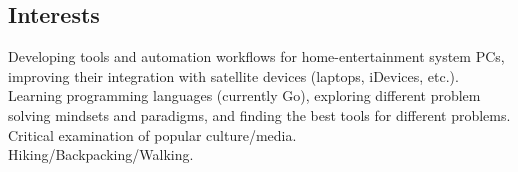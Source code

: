\documentclass[margin,line]{resume}
\begin{document}
\begin{resume}
    \section{\mysidestyle Interests} 

    Developing tools and automation workflows for home-entertainment system PCs, improving their integration with satellite devices (laptops, iDevices, etc.). \vspace{1mm}\\%
    Learning programming languages (currently Go), exploring different problem solving mindsets and paradigms, and finding the best tools for different problems. \vspace{1mm}\\%
    Critical examination of popular culture/media. \vspace{1mm}\\%
    Hiking/Backpacking/Walking. \vspace{1mm}\\%





\end{resume}
\end{document}
